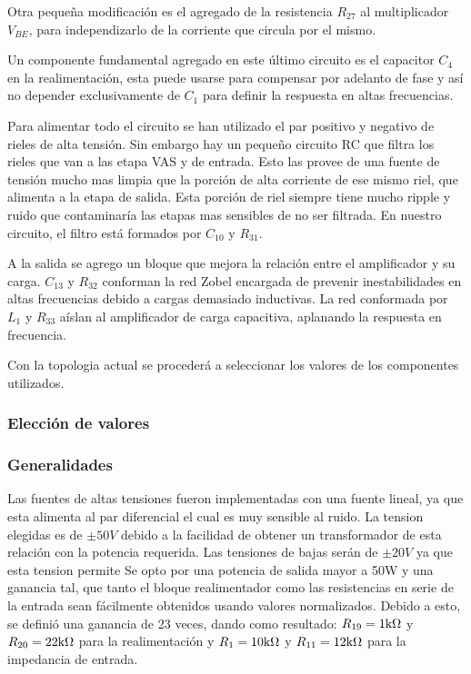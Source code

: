 Otra pequeña modificación es el agregado de la resistencia $R_{27}$ al multiplicador $V_{BE}$, para independizarlo de la corriente que circula por el mismo.

Un componente fundamental agregado en este último circuito es el capacitor $C_4$ en la realimentación, esta puede usarse para compensar por adelanto de fase y así no depender exclusivamente de $C_1$ para definir la respuesta en altas frecuencias.

Para alimentar todo el circuito se han utilizado el par positivo y negativo de rieles de alta tensión. Sin embargo hay un pequeño circuito RC que filtra los rieles que van a las etapa VAS y de entrada. Esto las provee de una fuente de tensión mucho mas limpia que la porción de alta corriente de ese mismo riel, que alimenta a la etapa de salida. Esta porción de riel siempre tiene mucho ripple y ruido que contaminaría las etapas mas sensibles de no ser filtrada. En nuestro circuito, el filtro está formados por $C_{10}$ y $R_{31}$.

A la salida se agrego un bloque que mejora la relación entre el amplificador y su carga. $C_{13}$ y $R_{32}$ conforman la red Zobel encargada de prevenir inestabilidades en altas frecuencias debido a cargas demasiado inductivas. La red conformada por $L_{1}$ y $R_{33}$ aíslan al amplificador de carga capacitiva, aplanando la respuesta en frecuencia.

Con la topologia actual se procederá a seleccionar los valores de los componentes utilizados. 
\medskip
\subsubsection{Elección de valores}
\medskip
\subsubsection*{Generalidades}
\medskip
Las fuentes de altas tensiones fueron implementadas con una fuente lineal, ya que esta alimenta al par diferencial el cual es muy sensible al ruido. La tension elegidas es de $\pm50V$ debido a la facilidad de obtener un transformador de esta relación con la potencia requerida. Las tensiones de bajas serán de $\pm20V$ ya que esta tension permite
Se opto por una potencia de salida mayor a 50W y una ganancia tal, que tanto el bloque realimentador como las resistencias en serie de la entrada sean fácilmente obtenidos usando valores normalizados. Debido a esto, se definió una ganancia de 23 veces, dando como resultado: $R_{19}=1\mbox{k}\Omega$ y $R_{20}=22\mbox{k}\Omega$ para la realimentación y $R_{1}=10\mbox{k}\Omega$ y $R_{11}=12\mbox{k}\Omega$ para la impedancia de entrada.
\medskip
